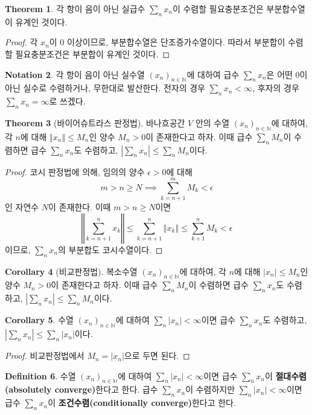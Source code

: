 \documentclass[11pt]{book}
\numberwithin{equation}{chapter}
\def\NN{\mathbb{N}}
\def\eps{\epsilon}
\newcommand{\abs}[1]{\left\vert#1\right\vert}
\newcommand{\norm}[1]{\left\Vert#1\right\Vert}
\theoremstyle{definition}
\newtheorem{thm}{Theorem}[section]
\newtheorem{cor}[thm]{Corollary}
\newtheorem{defn}[thm]{Definition}
\newtheorem{notn}[thm]{Notation}
\begin{document}
\begin{thm}
    각 항이 음이 아닌 실급수 \(\sum_n x_n\)이 수렴할 필요충분조건은 부분합수열이 유계인 것이다.
\end{thm}
\begin{proof}
    각 \(x_n\)이 0 이상이므로, 부분합수열은 단조증가수열이다. 따라서 부분합이 수렴할 필요충분조건은 부분합이 유계인 것이다.
\end{proof}

\begin{notn}
    각 항이 음이 아닌 실수열 \((x_n)_{n \in \NN}\)에 대하여 급수 \(\sum_n x_n\)은 어떤 0이 아닌 실수로 수렴하거나, 무한대로 발산한다. 전자의 경우 \(\sum_n x_n < \infty\), 후자의 경우 \(\sum_n x_n = \infty\)로 쓰겠다.
\end{notn}

\begin{thm}[바이어슈트라스 판정법]
    바나흐공간 \(V\) 안의 수열 \((x_n)_{n \in \NN}\)에 대하여, 각 \(n\)에 대해 \(\norm{x_n} \le M_n\)인 양수 \(M_n > 0\)이 존재한다고 하자. 이때 급수 \(\sum_n M_n\)이 수렴하면 급수 \(\sum_n x_n\)도 수렴하고, \(\abs{\sum_n x_n} \le \sum_n M_n\)이다.
\end{thm}
\begin{proof}
    코시 판정법에 의해, 임의의 양수 \(\eps > 0\)에 대해
    \[
    m > n \ge N \implies \sum_{k=n+1}^m M_k < \eps
    \]
    인 자연수 \(N\)이 존재한다. 이때 \(m > n \ge N\)이면
    \[
    \norm{\sum_{k=n+1}^n x_k} \le \sum_{k=n+1}^n \norm{x_k} \le \sum_{k+1}^n M_k < \eps
    \]
    이므로, \(\sum_n x_n\)의 부분합도 코시수열이다.
\end{proof}

\begin{cor}[비교판정법]
    복소수열 \((x_n)_{n \in \NN}\)에 대하여, 각 \(n\)에 대해 \(\abs{x_n} \le M_n\)인 양수 \(M_n > 0\)이 존재한다고 하자. 이때 급수 \(\sum_n M_n\)이 수렴하면 급수 \(\sum_n x_n\)도 수렴하고, \(\abs{\sum_n x_n} \le \sum_n M_n\)이다.
\end{cor}

\begin{cor} \label{cor 5.3.5}
    수열 \((x_n)_{n \in \NN}\)에 대하여 \(\sum_n \abs{x_n} < \infty\)이면 급수 \(\sum_n x_n\)도 수렴하고, \(\abs{\sum_n x_n} \le \sum_n \abs{x_n}\)이다.
\end{cor}
\begin{proof}
    비교판정법에서 \(M_n = \abs{x_n}\)으로 두면 된다.
\end{proof}

\begin{defn}
    수열 \((x_n)_{n \in \NN}\)에 대하여 \(\sum_n \abs{x_n} < \infty\)이면 급수 \(\sum_n x_n\)이 \textbf{절대수렴(absolutely converge)}한다고 한다. 급수 \(\sum_n x_n\)이 수렴하지만 \(\sum_n \abs{x_n} < \infty\)이면 급수 \(\sum_n x_n\)이 \textbf{조건수렴(conditionally converge)}한다고 한다.
\end{defn}
\end{document}
